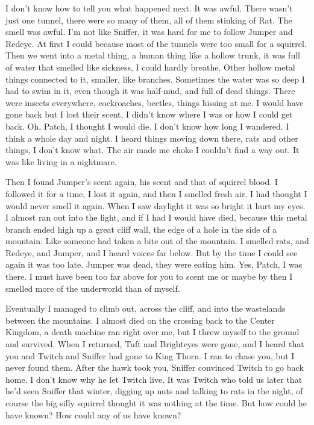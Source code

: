 \documentclass[12pt]{book}
\begin{document}
 I don't know how to tell you what happened next. It was awful. There wasn't just one tunnel, there were so many of them, all of them stinking of Rat. The smell was awful. I'm not like Sniffer, it was hard for me to follow Jumper and Redeye. At first I could because most of the tunnels were too small for a squirrel. Then we went into a metal thing, a human thing like a hollow trunk, it was full of water that smelled like sickness, I could hardly breathe. Other hollow metal things connected to it, smaller, like branches. Sometimes the water was so deep I had to swim in it, even though it was half-mud, and full of dead things. There were insects everywhere, cockroaches, beetles, things hissing at me. I would have gone back but I lost their scent, I didn't know where I was or how I could get back. Oh, Patch, I thought I would die. I don't know how long I wandered. I think a whole day and night. I heard things moving down there, rats and other things, I don't know what. The air made me choke I couldn't find a way out. It was like living in a nightmare.\par
 Then I found Jumper's scent again, his scent and that of squirrel blood. I followed it for a time, I lost it again, and then I smelled fresh air. I had thought I would never smell it again. When I saw daylight it was so bright it hurt my eyes. I almost ran out into the light, and if I had I would have died, because this metal branch ended high up a great cliff wall, the edge of a hole in the side of a mountain. Like someone had taken a bite out of the mountain. I smelled rats, and Redeye, and Jumper, and I heard voices far below. But by the time I could see again it was too late. Jumper was dead, they were eating him. Yes, Patch, I was there. I must have been too far above for you to scent me %
 or maybe by then I smelled more of the underworld than of myself.\par
 Eventually I managed to climb out, across the cliff, and into the wastelands between the mountains. I almost died on the crossing back to the Center Kingdom, a death machine ran right over me, but I threw myself to the ground and survived. When I returned, Tuft and Brighteyes were gone, and I heard that you and Twitch and Sniffer had gone to King Thorn. I ran to chase you, but I never found them. After the hawk took you, Sniffer convinced Twitch to go back home. I don't know why he let Twitch live. It was Twitch who told us later that he'd seen Sniffer that winter, digging up nuts and talking to rats in the night, of course the big silly squirrel thought it was nothing at the time. But how could he have known? How could any of us have known?\par
\end{document}
